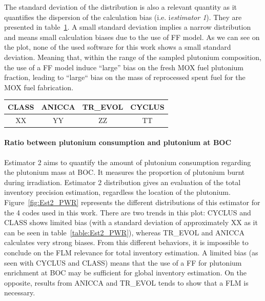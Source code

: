 The standard deviation of the distribution is also a relevant quantity as it
quantifies the dispersion of the calculation bias (i.e. i\textit{estimator 1}).
They are presented in table~\ref{table:Est1_PWR}. A small standard deviation
implies a narrow distribution and means small calculation biases due to the use
of \gls{FF} model. As we can see on the plot, none of the used software for this
work shows a small standard deviation. Meaning that, within the range of the
sampled plutonium composition, the use of a \gls{FF} model induce ``large'' bias
on the fresh \gls{MOX} fuel plutonium fraction, leading to ``large`` bias on the
mass of reprocessed spent fuel for the \gls{MOX} fuel fabrication.

\begin{table}[h]
	\begin{center}
		\begin{tabular}{|c||c||c||c|}
			\hline 
				CLASS & ANICCA & TR\_EVOL & CYCLUS \\
			\hline
				XX & YY & ZZ & TT \\
		\end{tabular}
	\end{center}
	\label{table:Est1_PWR}
\end{table}

\paragraph{Ratio between plutonium consumption and plutonium at \gls{BOC}}

Estimator 2 aims to quantify the amount of plutonium consumption regarding the
plutonium mass at \gls{BOC}. It measures the proportion of plutonium burnt
during irradiation. Estimator 2 distribution gives an evaluation of the total
inventory precision estimation, regardless the location of the plutonium.
Figure~\ref{fig:Est2_PWR} represents the different distributions of this estimator
for the 4 codes used in this work. There are two trends in this plot: CYCLUS and
CLASS shows limited bias (with a standard deviation of approximately XX as it
can be seen in table~\ref{table:Est2_PWR}), whereas TR\_EVOL and ANICCA
calculates very strong biases. From this different behaviors, it is impossible
to conclude on the \gls{FLM} relevance for total inventory estimation. A limited bias
(as seen with CYCLUS and CLASS) means that the use of a \gls{FF} for plutonium
enrichment at \gls{BOC} may be sufficient for global inventory estimation. On the
opposite, results from ANICCA and TR\_EVOL tends to show that a \gls{FLM} is
necessary. 

